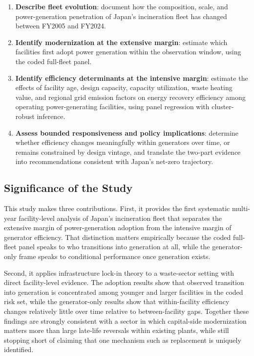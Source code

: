 \documentclass[12pt,a4paper]{article}
\begin{document}
\begin{enumerate}
  \item \textbf{Describe fleet evolution}: document how the composition, scale, and power-generation penetration of Japan's incineration fleet has changed between FY2005 and FY2024.
  \item \textbf{Identify modernization at the extensive margin}: estimate which facilities first adopt power generation within the observation window, using the coded full-fleet panel.
  \item \textbf{Identify efficiency determinants at the intensive margin}: estimate the effects of facility age, design capacity, capacity utilization, waste heating value, and regional grid emission factors on energy recovery efficiency among operating power-generating facilities, using panel regression with cluster-robust inference.
  \item \textbf{Assess bounded responsiveness and policy implications}: determine whether efficiency changes meaningfully within generators over time, or remains constrained by design vintage, and translate the two-part evidence into recommendations consistent with Japan's net-zero trajectory.
\end{enumerate}

\subsection{Significance of the Study}

This study makes three contributions. First, it provides the first systematic multi-year facility-level analysis of Japan's incineration fleet that separates the extensive margin of power-generation adoption from the intensive margin of generator efficiency. That distinction matters empirically because the coded full-fleet panel speaks to who transitions into generation at all, while the generator-only frame speaks to conditional performance once generation exists.

Second, it applies infrastructure lock-in theory to a waste-sector setting with direct facility-level evidence. The adoption results show that observed transition into generation is concentrated among younger and larger facilities in the coded risk set, while the generator-only results show that within-facility efficiency changes relatively little over time relative to between-facility gaps. Together these findings are strongly consistent with a sector in which capital-side modernization matters more than large late-life reversals within existing plants, while still stopping short of claiming that one mechanism such as replacement is uniquely identified.
\end{document}
